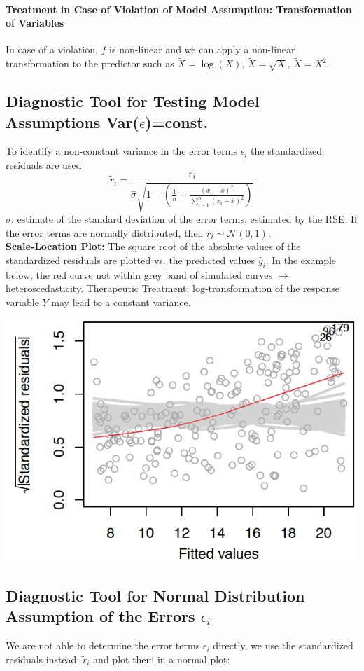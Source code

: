 \documentclass[11pt]{article}
\newcommand*\samplemean[1]{\overline{#1}}
\newcommand*\N[1]{\mathcal{N}\left(#1\right)}
\begin{document}
\paragraph{Treatment in Case of Violation of Model Assumption: Transformation of Variables}
In case of a violation, $f$ is non-linear and we can apply a non-linear transformation to the predictor such as $\widetilde{X}=\operatorname{log}(X)$, $\widetilde{X}=\sqrt{X}$, $\widetilde{X}=X^2$ 

\subsection{Diagnostic Tool for Testing Model Assumptions Var\texorpdfstring{($\epsilon$)=}\ const.}
To identify a non-constant variance in the error terms $\epsilon_i$ the standardized residuals are used
\begin{equation*}
	\widetilde{r}_i = \frac{r_i}{\hat{\sigma}\sqrt{1 - \left( \frac{1}{n} + \frac{(x_i - \samplemean{x})^2}{\sum_{i=1}^{n}(x_i - \samplemean{x})^2} \right)}}
\end{equation*}
$\hat{\sigma}$: estimate of the standard deviation of the error terms, estimated by the RSE. If the error terms are normally distributed, then $\widetilde{r}_i \sim \N{0,1}$.\\

\noindent
\textbf{Scale-Location Plot:} The square root of the absolute values of the standardized residuals are plotted vs. the predicted values $\hat{y}_i$. In the example below, the red curve not within grey band of simulated curves $\rightarrow$ heteroscedasticity. Therapeutic Treatment: log-transformation of the response variable $Y$ may lead to a constant variance.
\begin{center}
	\includegraphics[width=0.4\linewidth]{img/scale-location-plot}
\end{center}


\subsection{Diagnostic Tool for Normal Distribution Assumption of the Errors \texorpdfstring{$\epsilon_i$}\ }
We are not able to determine the error terms $\epsilon_i$ directly, we use the standardized residuals instead: $\widetilde{r}_i$ and plot them in a normal plot: 
\end{document}
